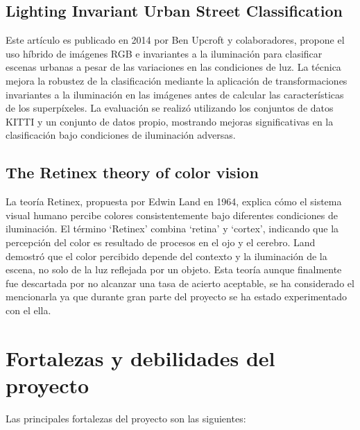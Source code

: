 \subsection{Lighting Invariant Urban Street Classification \cite{upcroft2014}}\label{upcroft-1}

Este artículo es publicado en 2014 por Ben Upcroft y colaboradores, propone el uso híbrido de imágenes RGB e invariantes a la iluminación para clasificar escenas urbanas a pesar de las variaciones en las condiciones de luz. La técnica mejora la robustez de la clasificación mediante la aplicación de transformaciones invariantes a la iluminación en las imágenes antes de calcular las características de los superpíxeles. La evaluación se realizó utilizando los conjuntos de datos KITTI y un conjunto de datos propio, mostrando mejoras significativas en la clasificación bajo condiciones de iluminación adversas.

\subsection{The Retinex theory of color vision \cite{retinex}}\label{retinex-1}

La teoría Retinex, propuesta por Edwin Land en 1964, explica cómo el sistema visual humano percibe colores consistentemente bajo diferentes condiciones de iluminación. El término `Retinex' combina `retina' y `cortex', indicando que la percepción del color es resultado de procesos en el ojo y el cerebro. Land demostró que el color percibido depende del contexto y la iluminación de la escena, no solo de la luz reflejada por un objeto. Esta teoría aunque finalmente fue descartada por no alcanzar una tasa de acierto aceptable, se ha considerado el mencionarla ya que durante gran parte del proyecto se ha estado experimentado con el ella.


\section{Fortalezas y debilidades del proyecto}\label{fortalezas-y-debilidades-del-proyecto}

Las principales fortalezas del proyecto son las siguientes:

